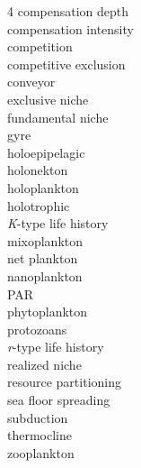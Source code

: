 
\begin{multicols}{4}
compensation depth \\
compensation intensity \\
competition \\
competitive exclusion \\
conveyor \\
exclusive niche \\
fundamental niche \\
gyre \\
holoepipelagic \\
holonekton \\
holoplankton \\
holotrophic \\
\textit{K}-type life history \\
mixoplankton \\
net plankton \\
nanoplankton \\
PAR \\
phytoplankton \\
protozoans \\
\textit{r}-type life history \\
realized niche \\
resource partitioning \\
sea floor spreading \\
subduction \\
thermocline \\
zooplankton
\end{multicols}
